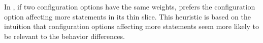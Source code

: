 In \ourtool, if two configuration options have the
same weights, \ourtool prefers the configuration option
affecting more statements in its thin slice. This heuristic
is based on the intuition that configuration options affecting
more statements seem more likely to be relevant to the behavior
differences.












%



